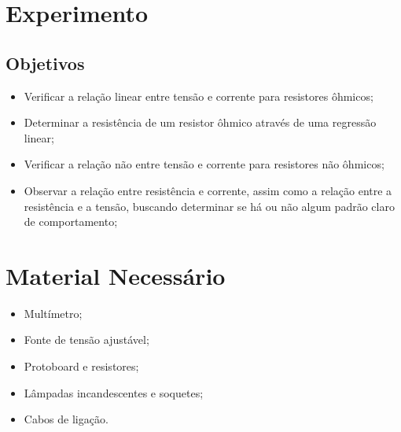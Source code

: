 
\section{Experimento}

\subsection{Objetivos}
\label{Sec:ObjetivosLeiDeOhm}

\begin{itemize}
	\item Verificar a relação linear entre tensão e corrente para resistores ôhmicos;
	\item Determinar a resistência de um resistor ôhmico através de uma regressão linear;
	\item Verificar a relação não entre tensão e corrente para resistores não ôhmicos;
	\item Observar a relação entre resistência e corrente, assim como a relação entre a resistência e a tensão, buscando determinar se há ou não algum padrão claro de comportamento;
\end{itemize}

\section{Material Necessário}

\begin{itemize}
	\item Multímetro;
	\item Fonte de tensão ajustável;
	\item Protoboard e resistores;
	\item Lâmpadas incandescentes e soquetes; 
	\item Cabos de ligação.
\end{itemize}

